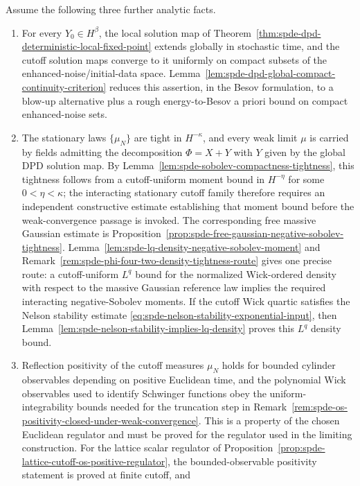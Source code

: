 \begin{hypothesis}
Assume the following three further analytic facts.
\begin{enumerate}[label=(\alph*)]
  \item For every \(Y_0\in H^\beta\), the local solution map of
  Theorem~\ref{thm:spde-dpd-deterministic-local-fixed-point} extends
  globally in stochastic time, and the cutoff solution maps converge to it
  uniformly on compact subsets of the enhanced-noise/initial-data space.
  Lemma~\ref{lem:spde-dpd-global-compact-continuity-criterion}
  reduces this assertion, in the Besov formulation, to a blow-up
  alternative plus a rough energy-to-Besov a priori bound on compact
  enhanced-noise sets.
  \item The stationary laws \(\{\mu_N\}\) are tight in \(H^{-\kappa}\), and
  every weak limit \(\mu\) is carried by fields admitting the decomposition
  \(\Phi=X+Y\) with \(Y\) given by the global DPD solution map.  By
  Lemma~\ref{lem:spde-sobolev-compactness-tightness}, this tightness
  follows from a cutoff-uniform moment bound in \(H^{-\eta}\) for some
  \(0<\eta<\kappa\); the interacting stationary cutoff family therefore
  requires an independent constructive estimate establishing that moment
  bound before the weak-convergence passage is invoked.  The corresponding
  free massive Gaussian estimate is
  Proposition~\ref{prop:spde-free-gaussian-negative-sobolev-tightness}.
  Lemma~\ref{lem:spde-lq-density-negative-sobolev-moment} and
  Remark~\ref{rem:spde-phi-four-two-density-tightness-route} gives one
  precise route: a cutoff-uniform \(L^q\) bound for the normalized
  Wick-ordered density with respect to the massive Gaussian reference law
  implies the required interacting negative-Sobolev moments.  If the cutoff
  Wick quartic satisfies the Nelson stability estimate
  \eqref{eq:spde-nelson-stability-exponential-input}, then
	  Lemma~\ref{lem:spde-nelson-stability-implies-lq-density} proves
  this \(L^q\) density bound.
  \item Reflection positivity of the cutoff measures \(\mu_N\) holds for
  bounded cylinder observables depending on positive Euclidean time, and
  the polynomial Wick observables used to identify Schwinger functions obey
  the uniform-integrability bounds needed for the truncation step in
  Remark~\ref{rem:spde-os-positivity-closed-under-weak-convergence}.
  This is a property of the chosen Euclidean regulator and must be proved for
  the regulator used in the limiting construction.  For the lattice scalar
  regulator of
  Proposition~\ref{prop:spde-lattice-cutoff-os-positive-regulator}, the
  bounded-observable positivity statement is proved at finite cutoff, and

\end{enumerate}
\end{hypothesis}
